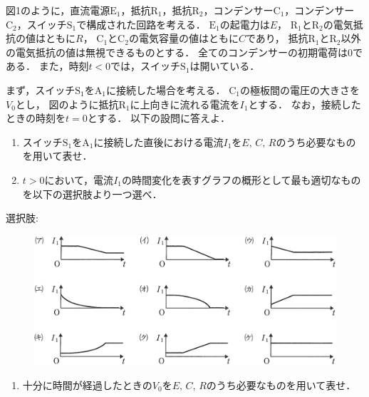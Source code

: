 \setcounter{figure}{0}

図1のように，直流電源$\text{E}_1$，抵抗$\text{R}_1$，抵抗$\text{R}_2$，コンデンサー$\text{C}_1$，コンデンサー$\text{C}_2$，スイッチ$\text{S}_1$で構成された回路を考える．
$\text{E}_1$の起電力は$E$，
$\text{R}_1$と$\text{R}_2$の電気抵抗の値はともに$R$，
$\text{C}_1$と$\text{C}_2$の電気容量の値はともに$C$であり，
抵抗$\text{R}_1$と$\text{R}_2$以外の電気抵抗の値は無視できるものとする．
全てのコンデンサーの初期電荷は$0$である．
また，時刻$t<0$では，スイッチ$\text{S}_1$は開いている．

まず，スイッチ$\text{S}_1$を$\text{A}_1$に接続した場合を考える．
$\text{C}_1$の極板間の電圧の大きさを$V_0$とし，
図のように抵抗$\text{R}_1$に上向きに流れる電流を$I_1$とする．
なお，接続したときの時刻を$t=0$とする．
以下の設問に答えよ．





\begin{enumerate}[（1）]
  \setlength{\leftskip}{-1zw}
  \setlength{\itemindent}{1zw}\setlength{\labelsep}{0.5zw}
  \setlength{\labelwidth}{1zw}\setlength{\leftmargin}{1zw}
  \setlength{\itemsep}{0.5\baselineskip}
  \item スイッチ$\text{S}_1$を$\text{A}_1$に接続した直後における電流$I_1$を$E,\,C,\,R$のうち必要なものを用いて表せ．
  \item $t>0$において，電流$I_1$の時間変化を表すグラフの概形として最も適切なものを以下の選択肢より一つ選べ．
\end{enumerate}

\noindent 選択肢:\par 
\begin{figure}[H]
  \centering
  \includegraphics[width=.8\columnwidth]{../graphs/nagoya_23_2-2.png}
\end{figure}

\begin{enumerate}[（1）]
  \setlength{\leftskip}{-1zw}
  \setlength{\itemindent}{1zw}\setlength{\labelsep}{0.5zw}
  \setlength{\labelwidth}{1zw}\setlength{\leftmargin}{1zw}
  \setlength{\itemsep}{0.5\baselineskip}
  \addtocounter{enumi}{2}
  \item 十分に時間が経過したときの$V_0$を$E,\,C,\,R$のうち必要なものを用いて表せ．
\end{enumerate}

